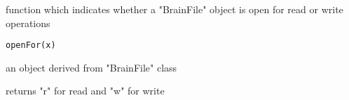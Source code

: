 \begin{Description}\relax
function which indicates whether a "BrainFile" object is open for read
or write operations
\end{Description}
\begin{Usage}
\begin{verbatim}
openFor(x)
\end{verbatim}
\end{Usage}
\begin{Arguments}
\begin{ldescription}
\item[\code{x}] an object derived from "BrainFile" class 
\end{ldescription}
\end{Arguments}
\begin{Value}
returns "r" for read and "w" for write
\end{Value}

